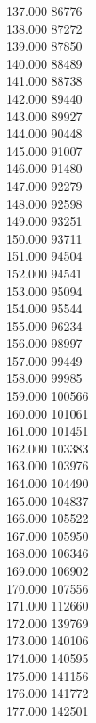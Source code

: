 { 137.000	86776 \\
 138.000	87272 \\
 139.000	87850 \\
 140.000	88489 \\
 141.000	88738 \\
 142.000	89440 \\
 143.000	89927 \\
 144.000	90448 \\
 145.000	91007 \\
 146.000	91480 \\
 147.000	92279 \\
 148.000	92598 \\
 149.000	93251 \\
 150.000	93711 \\
 151.000	94504 \\
 152.000	94541 \\
 153.000	95094 \\
 154.000	95544 \\
 155.000	96234 \\
 156.000	98997 \\
 157.000	99449 \\
 158.000	99985 \\
 159.000	100566 \\
 160.000	101061 \\
 161.000	101451 \\
 162.000	103383 \\
 163.000	103976 \\
 164.000	104490 \\
 165.000	104837 \\
 166.000	105522 \\
 167.000	105950 \\
 168.000	106346 \\
 169.000	106902 \\
 170.000	107556 \\
 171.000	112660 \\
 172.000	139769 \\
 173.000	140106 \\
 174.000	140595 \\
 175.000	141156 \\
 176.000	141772 \\
 177.000	142501 \\
}
